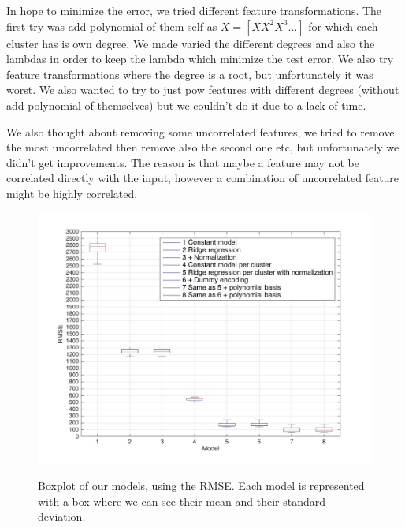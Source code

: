 \documentclass{article} %
\begin{document}
In hope to minimize the error, we tried different feature transformations. The first try was add polynomial of them self as $X = [X X^2 X^3 ...]$ for which each cluster has is own degree. We made varied the different degrees and also the lambdas in order to keep the lambda which minimize the test error. We also try feature transformations where the degree is a root, but unfortunately it was worst. We also wanted to try to just pow features with different degrees (without add polynomial of themselves) but we couldn't do it due to a lack of time.

We also thought about removing some uncorrelated features, we tried to remove the most uncorrelated then remove also the second one etc, but unfortunately we didn't get improvements. The reason is that maybe a feature may not be correlated directly with the input, however a combination of uncorrelated feature might be highly correlated.

\begin{figure}[!t]
\center
\includegraphics[width=6in]{figures/models.jpg} \label{fig:models}
\caption{Boxplot of our models, using the RMSE. Each model is represented with a box where we can see their mean and their standard deviation.}
\end{figure}
\end{document}
